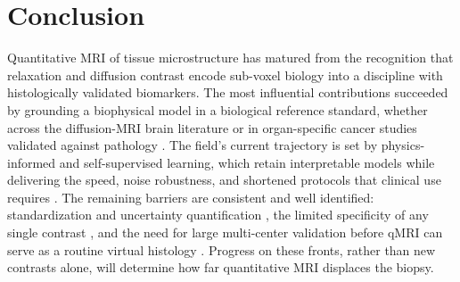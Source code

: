 \documentclass[sn-mathphys,Numbered]{sn-jnl}
\begin{document}
\section{Conclusion}\label{sec:conclusion}
Quantitative MRI of tissue microstructure has matured from the recognition that relaxation and diffusion contrast encode sub-voxel biology into a discipline with histologically validated biomarkers.
The most influential contributions succeeded by grounding a biophysical model in a biological reference standard, whether across the diffusion-MRI brain literature \cite{pmid29193413} or in organ-specific cancer studies validated against pathology \cite{pmid35258368,pmid34751615}.
The field's current trajectory is set by physics-informed and self-supervised learning, which retain interpretable models while delivering the speed, noise robustness, and shortened protocols that clinical use requires \cite{pmid39907585,pmid38471339}.
The remaining barriers are consistent and well identified: standardization and uncertainty quantification \cite{pmid33710907}, the limited specificity of any single contrast \cite{pmid29097317}, and the need for large multi-center validation before qMRI can serve as a routine virtual histology \cite{pmid38856839}.
Progress on these fronts, rather than new contrasts alone, will determine how far quantitative MRI displaces the biopsy.


\end{document}
